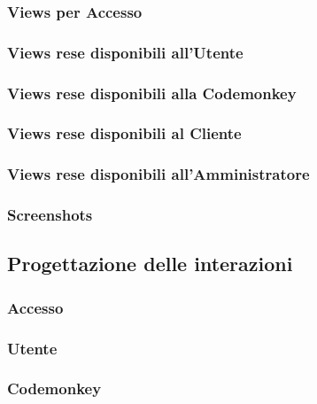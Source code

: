 \documentclass{article}
\begin{document}
\subsubsection{Views per Accesso}

\subsubsection{Views rese disponibili all'Utente}

\subsubsection{Views rese disponibili alla Codemonkey}

\subsubsection{Views rese disponibili al Cliente}

\subsubsection{Views rese disponibili all'Amministratore}

\subsubsection{Screenshots}


\subsection{Progettazione delle interazioni}
\subsubsection{Accesso}

\subsubsection{Utente}

\subsubsection{Codemonkey}

\end{document}
